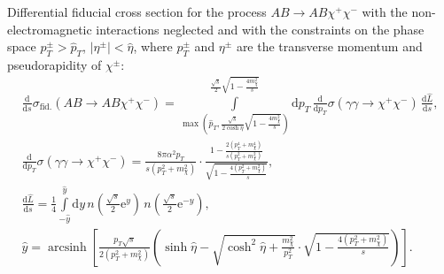 \documentclass[a4paper,12pt]{article}
\newcommand{\abs}[1]{\lvert #1 \rvert}
\DeclareMathOperator{\arcsinh}{arcsinh}
\begin{document}
Differential fiducial cross section for the process $AB \to AB \chi^+ \chi^-$
with the non-electromagnetic interactions neglected and with the constraints on
the phase space $p_T^\pm > \hat p_T$, $\abs{\eta^\pm} < \hat \eta$, where
$p_T^\pm$ and $\eta^\pm$ are the transverse momentum and pseudorapidity of
$\chi^\pm$:
\begin{gather}
  \frac{\mathrm{d}}{\mathrm{d} s} \sigma_\text{fid.}(AB \to AB \chi^+ \chi^-)
  = \int\limits_{
      \max \left(
        \hat p_T,
        \frac{\sqrt{s}}{2 \cosh \hat \eta} \sqrt{1 - \frac{4 m_\chi^2}{s}}
      \right)
    }^{\frac{\sqrt{s}}{2} \sqrt{1 - \frac{4 m_\chi^2}{s}}}
      \mathrm{d} p_T
      \, \frac{\mathrm{d}}{\mathrm{d} p_T}
         \sigma(\gamma \gamma \to \chi^+ \chi^-)
      \, \frac{\mathrm{d} \hat L}{\mathrm{d} s},
  \\
  \frac{\mathrm{d}}{\mathrm{d} p_T} \sigma(\gamma \gamma \to \chi^+ \chi^-)
  = \frac{8 \pi \alpha^2 p_T}{s (p_T^2 + m_\chi^2)}
    \cdot \frac{1 - \frac{2 (p_T^4 + m_\chi^4)}{s (p_T^2 + m_\chi^2)}}
               {\sqrt{1 - \frac{4 (p_T^2 + m_\chi^2)}{s}}},
  \\
  \frac{\mathrm{d} \hat L}{\mathrm{d} s}
  = \frac14
    \int\limits_{-\hat y}^{\hat y} \mathrm{d} y
    \, n \left( \frac{\sqrt{s}}{2} \mathrm{e}^y \right)
    \, n \left( \frac{\sqrt{s}}{2} \mathrm{e}^{-y} \right),
  \\
  \hat y = \arcsinh \left[
    \frac{p_T \sqrt{s}}{2 (p_T^2 + m_\chi^2)} \left(
      \sinh \hat \eta
      - \sqrt{\cosh^2 \hat \eta + \frac{m_\chi^2}{p_T^2}}
        \cdot \sqrt{1 - \frac{4 (p_T^2 + m_\chi^2)}{s}}
    \right)
  \right].
\end{gather}
\end{document}
